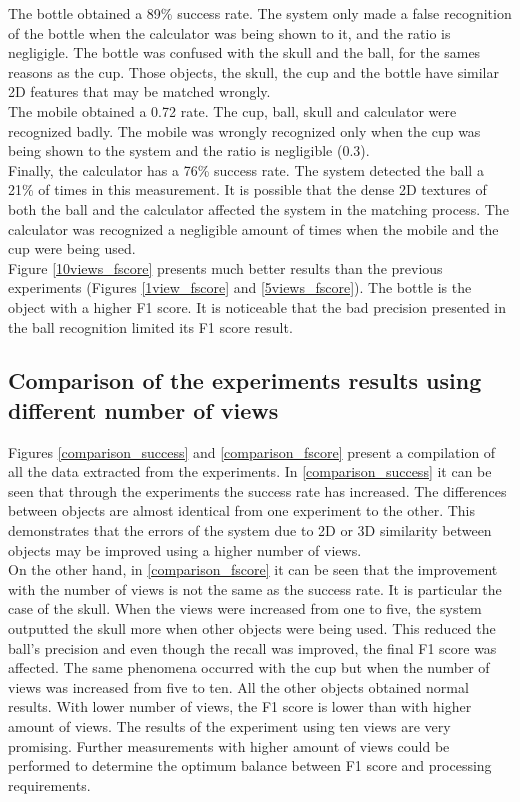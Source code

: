 	The bottle obtained a 89\% success rate. 
	The system only made a false recognition of the bottle when the calculator was being shown to it, and the ratio is negligigle. 
	The bottle was confused with the skull and the ball, for the sames reasons as the cup. 
	Those objects, the skull, the cup and the bottle have similar 2D features that may be matched wrongly. 
	\\
	The mobile obtained a 0.72 rate. 
	The cup, ball, skull and calculator were recognized badly. 
	The mobile was wrongly recognized only when the cup was being shown to the system and the ratio is negligible (0.3). 
	\\
	Finally, the calculator has a 76\% success rate. 
	The system detected the ball a 21\% of times in this measurement. 
	It is possible that the dense 2D textures of both the ball and the calculator affected the system in the matching process. 
	The calculator was recognized a negligible amount of times when the mobile and the cup were being used. 
	\\

	Figure \ref{10views_fscore} presents much better results than the previous experiments (Figures \ref{1view_fscore} and \ref{5views_fscore}).
	The bottle is the object with a higher F1 score. 
	It is noticeable that the bad precision presented in the ball recognition limited its F1 score result. 


	\subsection{Comparison of the experiments results using different number of views}
	Figures \ref{comparison_success} and \ref{comparison_fscore} present a compilation of all the data extracted from the experiments. 
	In \ref{comparison_success} it can be seen that through the experiments the success rate has increased. 
	The differences between objects are almost identical from one experiment to the other. 
	This demonstrates that the errors of the system due to 2D or 3D similarity between objects may be improved using a higher number of views. 
	\\
	On the other hand, in \ref{comparison_fscore} it can be seen that the improvement with the number of views is not the same as the success rate. 
	It is particular the case of the skull. 
	When the views were increased from one to five, the system outputted the skull more when other objects were being used. 
	This reduced the ball's precision and even though the recall was improved, the final F1 score was affected.  
	The same phenomena occurred with the cup but when the number of views was increased from five to ten. 
	All the other objects obtained normal results. 
	With lower number of views, the F1 score is lower than with higher amount of views. 
	The results of the experiment using ten views are very promising. 
	Further measurements with higher amount of views could be performed to determine the optimum balance between F1 score and processing requirements. 